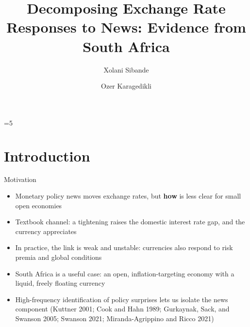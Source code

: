 \documentclass[
  ignorenonframetext,
  aspectratio=141,
]{beamer}
\title{Decomposing Exchange Rate Responses to News: Evidence from South
Africa}
\author{Xolani Sibande \and Ozer Karagedikli}
\date{}
\institute{South Africa Reserve Bank}
\providecommand{\tightlist}{%
  \setlength{\itemsep}{0pt}\setlength{\parskip}{0pt}}\usepackage{longtable,booktabs,array}
\let\oldsection\section
\renewcommand{\section}{\ifnum\value{section}=5 \appendix\fi\oldsection}
\begin{document}
\frame{\titlepage}

\section{Introduction}\label{introduction}

\begin{frame}{Motivation}
\label{motivation}
\begin{itemize}
\tightlist
\item
  Monetary policy news moves exchange rates, but \textbf{how} is less
  clear for small open economies
\item
  Textbook channel: a tightening raises the domestic interest rate gap,
  and the currency appreciates
\item
  In practice, the link is weak and unstable: currencies also respond to
  risk premia and global conditions
\item
  South Africa is a useful case: an open, inflation-targeting economy
  with a liquid, freely floating currency
\item
  High-frequency identification of policy surprises lets us isolate the
  news component (Kuttner 2001; Cook and Hahn 1989; Gurkaynak, Sack, and
  Swanson 2005; Swanson 2021; Miranda-Agrippino and Ricco 2021)
\end{itemize}
\end{frame}
\end{document}
